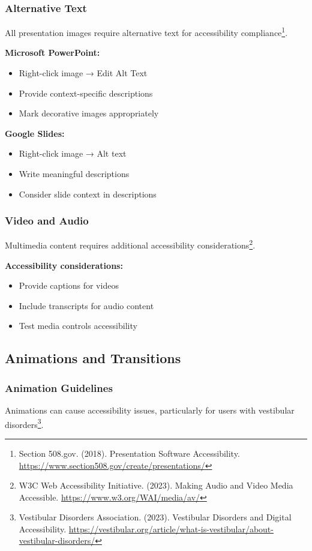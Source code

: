 \subsubsection{Alternative Text}
All presentation images require alternative text for accessibility compliance\footnote{Section 508.gov. (2018). Presentation Software Accessibility. \url{https://www.section508.gov/create/presentations/}}.

\textbf{Microsoft PowerPoint:}
\begin{itemize}
\item Right-click image → Edit Alt Text
\item Provide context-specific descriptions
\item Mark decorative images appropriately
\end{itemize}

\textbf{Google Slides:}
\begin{itemize}
\item Right-click image → Alt text
\item Write meaningful descriptions
\item Consider slide context in descriptions
\end{itemize}

\subsubsection{Video and Audio}
Multimedia content requires additional accessibility considerations\footnote{W3C Web Accessibility Initiative. (2023). Making Audio and Video Media Accessible. \url{https://www.w3.org/WAI/media/av/}}.

\textbf{Accessibility considerations:}
\begin{itemize}
\item Provide captions for videos
\item Include transcripts for audio content
\item Test media controls accessibility
\end{itemize}

\subsection{Animations and Transitions}

\subsubsection{Animation Guidelines}
Animations can cause accessibility issues, particularly for users with vestibular disorders\footnote{Vestibular Disorders Association. (2023). Vestibular Disorders and Digital Accessibility. \url{https://vestibular.org/article/what-is-vestibular/about-vestibular-disorders/}}.

